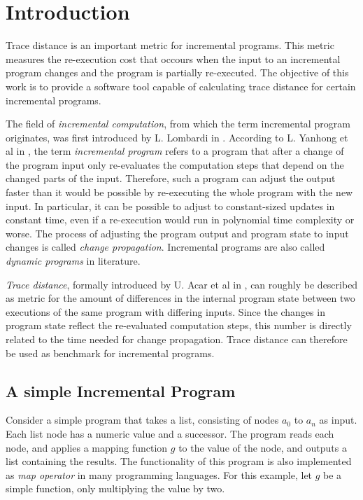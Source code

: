 
\chapter{Introduction}
\label{ch:Introduction}

Trace distance is an important metric for incremental programs. This metric measures the re-execution cost that occours when the input to an incremental program changes and the program is partially re-executed. The objective of this work is to provide a software tool capable of calculating trace distance for certain incremental programs.  

The field of \textit{incremental computation}, from which the term incremental program originates, was first introduced by L. Lombardi in \cite{lombardi1967incremental}. According to L. Yanhong et al in \cite{liu1995systematic}, the term \textit{incremental program} refers to a program that after a change of the program input only re-evaluates the computation steps that depend on the changed parts of the input. Therefore, such a program can adjust the output faster than it would be possible by re-executing the whole program with the new input. In particular, it can be possible to adjust to constant-sized updates in constant time, even if a re-execution would run in polynomial time complexity or worse. The process of adjusting the program output and program state to input changes is called \textit{change propagation}. Incremental programs are also called \textit{dynamic programs} in literature. 

\textit{Trace distance}, formally introduced by U. Acar et al in \cite{acar2004dynamizing}, can roughly be described as metric for the amount of differences in the internal program state between two executions of the same program with differing inputs. Since the changes in program state reflect the re-evaluated computation steps, this number is directly related to the time needed for change propagation. Trace distance can therefore be used as benchmark for incremental programs. 

\section{A simple Incremental Program}
\label{sec:simple_example}
Consider a simple program that takes a list, consisting of nodes $a_0$ to $a_n$ as input. Each list node has a numeric value and a successor. The program reads each node, and applies a mapping function $g$ to the value of the node, and outputs a list containing the results. The functionality of this program is also implemented as \textit{map operator} in many programming languages. For this example, let $g$ be a simple function, only multiplying the value by two. 

